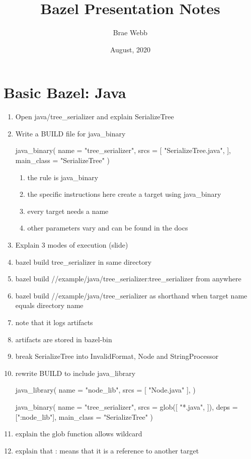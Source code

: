 \documentclass{article}
\title{Bazel Presentation Notes}
\author{Brae Webb}
\date{August, 2020}
\begin{document}
    \maketitle


\section{Basic Bazel: Java}
\begin{enumerate}
    \item Open java/tree\_serializer and explain SerializeTree
    \item Write a BUILD file for java\_binary
\begin{bazel}
java_binary(
    name = "tree_serializer",
    srcs = [
        "SerializeTree.java",
    ],
    main_class = "SerializeTree"
)
\end{bazel}
    \begin{enumerate}
        \item the rule is java\_binary
        \item the specific instructions here create a target using java\_binary
        \item every target needs a name
        \item other parameters vary and can be found in the docs
    \end{enumerate}
    \item Explain 3 modes of execution (slide)
    \item bazel build tree\_serializer in same directory
    \item bazel build //example/java/tree\_serializer:tree\_serializer from anywhere
    \item bazel build //example/java/tree\_serializer as shorthand when target
    name equals directory name
    \item note that it logs artifacts
    \item artifacts are stored in bazel-bin
    \item break SerializeTree into InvalidFormat, Node and StringProcessor
    \item rewrite BUILD to include java\_library
\begin{bazel}
java_library(
    name = "node_lib",
    srcs = [
        "Node.java"
    ],
)

java_binary(
    name = "tree_serializer",
    srcs = glob([
        "*.java",
    ]),
    deps = [":node_lib"],
    main_class = "SerializeTree"
)    
\end{bazel}
    \item explain the glob function allows wildcard
    \item explain that : means that it is a reference to another target
\end{enumerate}
\end{document}
